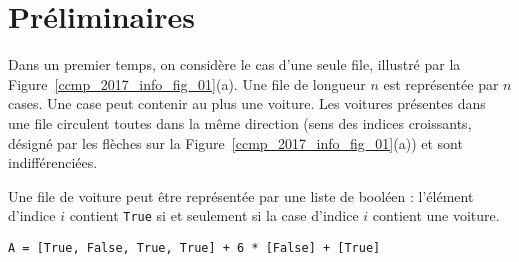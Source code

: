 	

\section{Préliminaires}



Dans un premier temps, on considère le cas d'une seule file, illustré par la Figure~\ref{ccmp_2017_info_fig_01}(a). Une file de
longueur $n$ est représentée par $n$ cases. Une case peut contenir au plus une voiture. Les voitures
présentes dans une file circulent toutes dans la même direction (sens des indices croissants, désigné
par les flèches sur la Figure~\ref{ccmp_2017_info_fig_01}(a)) et sont indifférenciées.

\ifprof
\begin{corrige}
Une file de voiture peut \^etre représentée par une liste de booléen : l'élément d'indice $i$ contient \lstinline{True} si et seulement si la case d'indice $i$ contient une voiture.
\end{corrige}
\else
\fi

\ifprof
\begin{corrige}
 \lstinline{A = [True, False, True, True] + 6 * [False] + [True]}
\end{corrige}
\else
\fi

